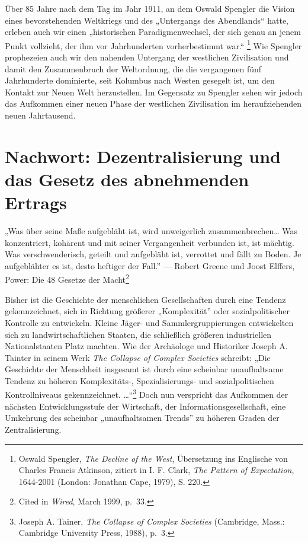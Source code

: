 \documentclass[
  a5paper,
  smalldemyvopaper,10pt,twoside,onecolumn,openright,extrafontsizes,hidelinks]{memoir}
\renewenvironment{quote}%
               {\list{}{\rightmargin=.6cm\leftmargin=.6cm}%
                \itshape \item[]}%
               {\endlist}
\begin{document}
Über 85 Jahre nach dem Tag im Jahr 1911, an dem Oswald Spengler die
Vision eines bevorstehenden Weltkriegs und des „Untergangs des
Abendlands`` hatte, erleben auch wir einen „historischen
Paradigmenwechsel, der sich genau an jenem Punkt vollzieht, der ihm vor
Jahrhunderten vorherbestimmt war.`` \footnote{Oswald Spengler, \emph{The
  Decline of the West}, Übersetzung ins Englische von Charles Francis
  Atkinson, zitiert in I. F. Clark, \emph{The Pattern of Expectation},
  1644-2001 (London: Jonathan Cape, 1979), S. 220.} Wie Spengler
prophezeien auch wir den nahenden Untergang der westlichen Zivilisation
und damit den Zusammenbruch der Weltordnung, die die vergangenen fünf
Jahrhunderte dominierte, seit Kolumbus nach Westen gesegelt ist, um den
Kontakt zur Neuen Welt herzustellen. Im Gegensatz zu Spengler sehen wir
jedoch das Aufkommen einer neuen Phase der westlichen Zivilisation im
heraufziehenden neuen Jahrtausend.


\chapter*{Nachwort: Dezentralisierung und das Gesetz des abnehmenden
Ertrags}\label{nachwort-dezentralisierung-und-das-gesetz-des-abnehmenden-ertrags}


\begin{quote}
„Was über seine Maße aufgebläht ist, wird unweigerlich
zusammenbrechen\ldots{} Was konzentriert, kohärent und mit seiner
Vergangenheit verbunden ist, ist mächtig. Was verschwenderisch, geteilt
und aufgebläht ist, verrottet und fällt zu Boden. Je aufgeblähter es
ist, desto heftiger der Fall.'' --- Robert Greene und Joost Elffers,
Power: Die 48 Gesetze der Macht\footnote{Cited in \emph{Wired}, March
  1999, p.~33.}
\end{quote}

Bisher ist die Geschichte der menschlichen Gesellschaften durch eine
Tendenz gekennzeichnet, sich in Richtung größerer „Komplexität'' oder
sozialpolitischer Kontrolle zu entwickeln. Kleine Jäger- und
Sammlergruppierungen entwickelten sich zu landwirtschaftlichen Staaten,
die schließlich größeren industriellen Nationalstaaten Platz machten.
Wie der Archäologe und Historiker Joseph A. Tainter in seinem Werk
\emph{The Collapse of Complex Societies} schreibt: „Die Geschichte der
Menschheit insgesamt ist durch eine scheinbar unaufhaltsame Tendenz zu
höheren Komplexitäts-, Spezialisierungs- und sozialpolitischen
Kontrollniveaus gekennzeichnet. \ldots{}``\footnote{Joseph A. Tainer,
  \emph{The Collapse of Complex Societies} (Cambridge, Mass.: Cambridge
  University Press, 1988), p.~3.} Doch nun verspricht das Aufkommen der
nächsten Entwicklungsstufe der Wirtschaft, der Informationsgesellschaft,
eine Umkehrung des scheinbar „unaufhaltsamen Trends'' zu höheren Graden
der Zentralisierung.
\end{document}
